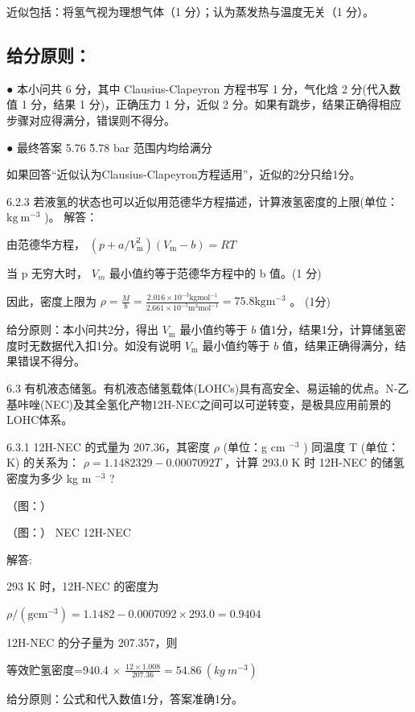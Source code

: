 近似包括：将氢气视为理想气体（1 分）；认为蒸发热与温度无关（1 分）。

\subsection*{给分原则：}

● 本小问共 6 分，其中 Clausius-Clapeyron 方程书写 1 分，气化焓 2 分(代入数值 1 分，结果 1 分)，正确压力 1 分，近似 2 分。如果有跳步，结果正确得相应步骤对应得满分，错误则不得分。

● 最终答案 5.76 \~ 5.78 bar 范围内均给满分

\- 如果回答“近似认为Clausius-Clapeyron方程适用”，近似的2分只给1分。

6.2.3 若液氢的状态也可以近似用范德华方程描述，计算液氢密度的上限(单位： $\mathrm{kg}\ \mathrm{m}^{-3}$ )。
解答：

由范德华方程， $(p+a/V_{\mathrm{m}}^{2})(V_{\mathrm{m}}-b)=RT$

当 p 无穷大时， $V_{m}$ 最小值约等于范德华方程中的 b 值。(1 分)

因此，密度上限为 $\rho = \frac{M}{b} = \frac{2.016\times 10^{-3}\mathrm{kg mol^{-1}}}{2.661\times 10^{-5}\mathrm{m}^3\mathrm{mol}^{-1}} = 75.8\mathrm{kg m^{-3}}$ 。 (1分)

给分原则：本小问共2分，得出 $V_{\mathrm{m}}$ 最小值约等于 $b$ 值1分，结果1分，计算储氢密度时无数据代入扣1分。如没有说明 $V_{\mathrm{m}}$ 最小值约等于 $b$ 值，结果正确得满分，结果错误不得分。

6.3 有机液态储氢。有机液态储氢载体(LOHCs)具有高安全、易运输的优点。N-乙基咔唑(NEC)及其全氢化产物12H-NEC之间可以可逆转变，是极具应用前景的LOHC体系。

6.3.1 12H-NEC 的式量为 207.36，其密度 $\rho$ (单位：g cm $^{-3}$ ) 同温度 T (单位：K) 的关系为： $\rho = 1.1482329 - 0.0007092T$ ，计算 293.0 K 时 12H-NEC 的储氢密度为多少 kg m $^{-3}$ ?

（图：）

（图：）
NEC
12H-NEC

解答:

293 K 时，12H-NEC 的密度为

$
\rho / (\mathrm{gcm} ^ {- 3}) = 1. 1 4 8 2 - 0. 0 0 0 7 0 9 2 \times 2 9 3. 0 = 0. 9 4 0 4
$

12H-NEC 的分子量为 207.357，则

等效贮氢密度=940.4 × $\frac{12\times1.008}{207.36}=54.86\ (kg\ m^{-3})$

给分原则：公式和代入数值1分，答案准确1分。


